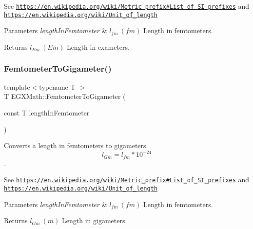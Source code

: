 See \href{https://en.wikipedia.org/wiki/Metric_prefix#List_of_SI_prefixes}{\tt https\+://en.\+wikipedia.\+org/wiki/\+Metric\+\_\+prefix\#\+List\+\_\+of\+\_\+\+S\+I\+\_\+prefixes} and \href{https://en.wikipedia.org/wiki/Unit_of_length}{\tt https\+://en.\+wikipedia.\+org/wiki/\+Unit\+\_\+of\+\_\+length} 
\begin{DoxyParams}{Parameters}
{\em length\+In\+Femtometer} & $ l_{fm}\ (fm)$ Length in femtometers. \\
\hline
\end{DoxyParams}
\begin{DoxyReturn}{Returns}
$ l_{Em}\ (Em)$ Length in exameters. 
\end{DoxyReturn}
\mbox{\label{group___e_g_x_math-_conversions-_length_conversions-_femtometer-_s_i_gaccd849112d6d7fed98d4c4d737ec8872}} 
\subsubsection{\texorpdfstring{Femtometer\+To\+Gigameter()}{FemtometerToGigameter()}}
{\footnotesize\ttfamily template$<$typename T $>$ \\
T E\+G\+X\+Math\+::\+Femtometer\+To\+Gigameter (\begin{DoxyParamCaption}\item[{const T}]{length\+In\+Femtometer }\end{DoxyParamCaption})}



Converts a length in femtometers to gigameters. \[ l_{Gm}=l_{fm} * 10^{-24} \]. 

See \href{https://en.wikipedia.org/wiki/Metric_prefix#List_of_SI_prefixes}{\tt https\+://en.\+wikipedia.\+org/wiki/\+Metric\+\_\+prefix\#\+List\+\_\+of\+\_\+\+S\+I\+\_\+prefixes} and \href{https://en.wikipedia.org/wiki/Unit_of_length}{\tt https\+://en.\+wikipedia.\+org/wiki/\+Unit\+\_\+of\+\_\+length} 
\begin{DoxyParams}{Parameters}
{\em length\+In\+Femtometer} & $ l_{fm}\ (fm)$ Length in femtometers. \\
\hline
\end{DoxyParams}
\begin{DoxyReturn}{Returns}
$ l_{Gm}\ (m)$ Length in gigameters. 
\end{DoxyReturn}
\mbox{\label{group___e_g_x_math-_conversions-_length_conversions-_femtometer-_s_i_gae889d6c7cbcb59336da14db49d503935}} 
